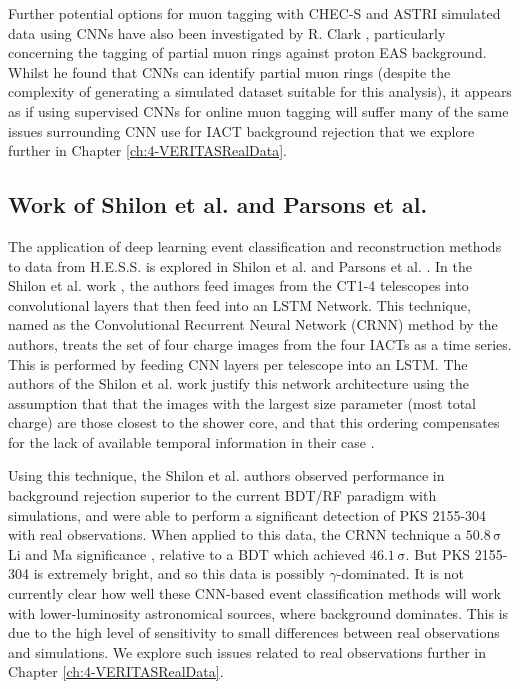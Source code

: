 Further potential options for muon tagging with CHEC-S and ASTRI simulated data using CNNs have also been investigated by R. Clark \cite{roganthesis}, particularly concerning the tagging of partial muon rings against proton EAS background. Whilst he found that CNNs can identify partial muon rings (despite the complexity of generating a simulated dataset suitable for this analysis), it appears as if using supervised CNNs for online muon tagging will suffer many of the same issues surrounding CNN use for IACT background rejection that we explore further in Chapter \ref{ch:4-VERITASRealData}.

\subsection{Work of Shilon et al. and Parsons et al.}
The application of deep learning event classification and reconstruction methods to data from H.E.S.S. is explored in Shilon et al. \cite{Shilon} and Parsons et al. \cite{ParsonsOhm}. In the Shilon et al. work \cite{Shilon}, the authors feed images from the CT1-4 telescopes into convolutional layers that then feed into an LSTM Network. This technique, named as the Convolutional Recurrent Neural Network (CRNN) method by the authors, treats the set of four charge images from the four IACTs as a time series. This is performed by feeding CNN layers per telescope into an LSTM. The authors of the Shilon et al. work justify this network architecture using the assumption that that the images with the largest size parameter (most total charge) are those closest to the shower core, and that this ordering compensates for the lack of available temporal information in their case \cite{Shilon}.

Using this technique, the Shilon et al. authors observed performance in background rejection superior to the current BDT/RF paradigm with simulations, and were able to perform a significant detection of PKS 2155-304 with real observations. When applied to this data, the CRNN technique a $\mathrm{50.8\,\sigma}$ Li and Ma significance \cite{LiMa}, relative to a BDT which achieved $\mathrm{46.1\,\sigma}$. But PKS 2155-304 is extremely bright, and so this data is possibly $\gamma$-dominated. It is not currently clear how well these CNN-based event classification methods will work with lower-luminosity astronomical sources, where background dominates. This is due to the high level of sensitivity to small differences between real observations and simulations. We explore such issues related to real observations further in Chapter \ref{ch:4-VERITASRealData}.

